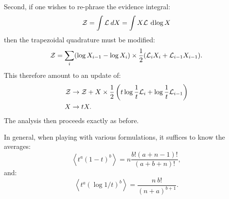 Second, if one wishes to re-phrase the evidence integral:
\begin{equation}
  \mathcal{Z} = \int \mathcal{L} \: dX = \int X\mathcal{L} \: \operatorname{d}^{}\!{\log X}
\end{equation}
then the trapezoidal quadrature must be modified:
\begin{equation}
  \mathcal{Z} = \sum\limits_{i} (\log X_{i-1}-\log X_{i}) \times \frac{1}{2}(\mathcal{L}_i X_i+\mathcal{L}_{i-1} X_{i-1}).
\end{equation}
This therefore amount to an update of:
\begin{align}
  \mathcal{Z} &\to \mathcal{Z} + X \times \frac{1}{2}\left(t\log\frac{1}{t}\mathcal{L}_i + \log\frac{1}{t}\mathcal{L}_{i-1} \right)
  \\
  X &\to t X.
\end{align}
The analysis then proceeds exactly as before. 

In general, when playing with various formulations, it suffices to know the averages:
\begin{equation}
\left\langle t^a{(1-t)}^b \right\rangle = n\frac{b!(a+n-1)!}{(a+b+n)!},
\end{equation}
and:
\begin{equation}
  \left\langle t^a{\left( \log1/t \right)}^b \right\rangle 
  = 
  \frac{n\: b!}{{(n+a)}^{b+1}}.
\end{equation}

